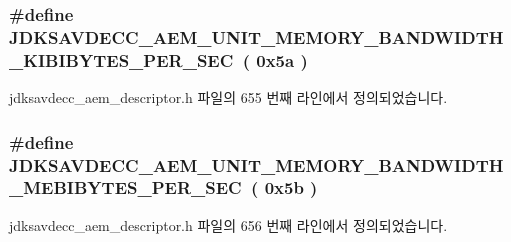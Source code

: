 \subsubsection[{\texorpdfstring{J\+D\+K\+S\+A\+V\+D\+E\+C\+C\+\_\+\+A\+E\+M\+\_\+\+U\+N\+I\+T\+\_\+\+M\+E\+M\+O\+R\+Y\+\_\+\+B\+A\+N\+D\+W\+I\+D\+T\+H\+\_\+\+K\+I\+B\+I\+B\+Y\+T\+E\+S\+\_\+\+P\+E\+R\+\_\+\+S\+EC}{JDKSAVDECC_AEM_UNIT_MEMORY_BANDWIDTH_KIBIBYTES_PER_SEC}}]{\setlength{\rightskip}{0pt plus 5cm}\#define J\+D\+K\+S\+A\+V\+D\+E\+C\+C\+\_\+\+A\+E\+M\+\_\+\+U\+N\+I\+T\+\_\+\+M\+E\+M\+O\+R\+Y\+\_\+\+B\+A\+N\+D\+W\+I\+D\+T\+H\+\_\+\+K\+I\+B\+I\+B\+Y\+T\+E\+S\+\_\+\+P\+E\+R\+\_\+\+S\+EC~( 0x5a )}\hypertarget{group__units_ga312e662bea7b89f7f2168fb4181895ad}{}\label{group__units_ga312e662bea7b89f7f2168fb4181895ad}


jdksavdecc\+\_\+aem\+\_\+descriptor.\+h 파일의 655 번째 라인에서 정의되었습니다.

\subsubsection[{\texorpdfstring{J\+D\+K\+S\+A\+V\+D\+E\+C\+C\+\_\+\+A\+E\+M\+\_\+\+U\+N\+I\+T\+\_\+\+M\+E\+M\+O\+R\+Y\+\_\+\+B\+A\+N\+D\+W\+I\+D\+T\+H\+\_\+\+M\+E\+B\+I\+B\+Y\+T\+E\+S\+\_\+\+P\+E\+R\+\_\+\+S\+EC}{JDKSAVDECC_AEM_UNIT_MEMORY_BANDWIDTH_MEBIBYTES_PER_SEC}}]{\setlength{\rightskip}{0pt plus 5cm}\#define J\+D\+K\+S\+A\+V\+D\+E\+C\+C\+\_\+\+A\+E\+M\+\_\+\+U\+N\+I\+T\+\_\+\+M\+E\+M\+O\+R\+Y\+\_\+\+B\+A\+N\+D\+W\+I\+D\+T\+H\+\_\+\+M\+E\+B\+I\+B\+Y\+T\+E\+S\+\_\+\+P\+E\+R\+\_\+\+S\+EC~( 0x5b )}\hypertarget{group__units_ga312246dbd765b11741c82978c6cf6044}{}\label{group__units_ga312246dbd765b11741c82978c6cf6044}


jdksavdecc\+\_\+aem\+\_\+descriptor.\+h 파일의 656 번째 라인에서 정의되었습니다.

